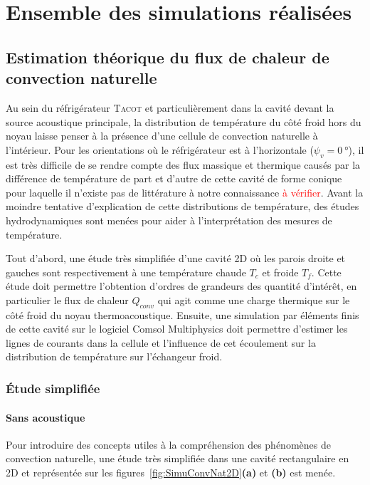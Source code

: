 \section{Ensemble des simulations réalisées}\label{chap:SimusRealisees}
\subsection{Estimation théorique du flux de chaleur de convection naturelle}
Au sein du réfrigérateur \textsc{Tacot} et particulièrement dans la cavité devant la source acoustique principale, la distribution de température du côté froid hors du noyau laisse penser à la présence d'une cellule de convection naturelle à l'intérieur. Pour les orientations où le réfrigérateur est à l'horizontale ($\psi_v=\qty{0}{\degree}$), il est très difficile de se rendre compte des flux massique et thermique causés par la différence de température de part et d'autre de cette cavité de forme conique pour laquelle il n'existe pas de littérature à notre connaissance \textcolor{red}{à vérifier}. Avant la moindre tentative d'explication de cette distributions de température, des études hydrodynamiques sont menées pour aider à l'interprétation des mesures de température. 

Tout d'abord, une étude très simplifiée d'une cavité 2D où les parois droite et gauches sont respectivement à une température chaude $T_c$ et froide $T_f$. Cette étude doit permettre l'obtention d'ordres de grandeurs des quantité d'intérêt, en particulier le flux de chaleur $Q_{conv}$ qui agit comme une charge thermique sur le côté froid du noyau thermoacoustique. Ensuite, une simulation par éléments finis de cette cavité sur le logiciel Comsol Multiphysics doit permettre d'estimer les lignes de courants dans la cellule et l'influence de cet écoulement sur la distribution de température sur l'échangeur froid.

\subsubsection{\'Etude simplifiée}
\paragraph{Sans acoustique}
Pour introduire des concepts utiles à la compréhension des phénomènes de convection naturelle, une étude très simplifiée dans une cavité rectangulaire en 2D et représentée sur les figures~\ref{fig:SimuConvNat2D}\textbf{(a)} et \textbf{(b)} est menée. 

